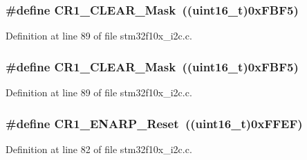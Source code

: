 \subsubsection[{\texorpdfstring{C\+R1\+\_\+\+C\+L\+E\+A\+R\+\_\+\+Mask}{CR1_CLEAR_Mask}}]{\setlength{\rightskip}{0pt plus 5cm}\#define C\+R1\+\_\+\+C\+L\+E\+A\+R\+\_\+\+Mask~(({\bf uint16\+\_\+t})0x\+F\+B\+F5)}\hypertarget{group___i2_c___private___defines_ga67f7dd35ea3d1296677e5fc50b88fa90}{}\label{group___i2_c___private___defines_ga67f7dd35ea3d1296677e5fc50b88fa90}


Definition at line 89 of file stm32f10x\+\_\+i2c.\+c.

\subsubsection[{\texorpdfstring{C\+R1\+\_\+\+C\+L\+E\+A\+R\+\_\+\+Mask}{CR1_CLEAR_Mask}}]{\setlength{\rightskip}{0pt plus 5cm}\#define C\+R1\+\_\+\+C\+L\+E\+A\+R\+\_\+\+Mask~(({\bf uint16\+\_\+t})0x\+F\+B\+F5)}\hypertarget{group___i2_c___private___defines_ga67f7dd35ea3d1296677e5fc50b88fa90}{}\label{group___i2_c___private___defines_ga67f7dd35ea3d1296677e5fc50b88fa90}


Definition at line 89 of file stm32f10x\+\_\+i2c.\+c.

\subsubsection[{\texorpdfstring{C\+R1\+\_\+\+E\+N\+A\+R\+P\+\_\+\+Reset}{CR1_ENARP_Reset}}]{\setlength{\rightskip}{0pt plus 5cm}\#define C\+R1\+\_\+\+E\+N\+A\+R\+P\+\_\+\+Reset~(({\bf uint16\+\_\+t})0x\+F\+F\+E\+F)}\hypertarget{group___i2_c___private___defines_ga173b065ec9b7b33c0fa0bf71c0fa2207}{}\label{group___i2_c___private___defines_ga173b065ec9b7b33c0fa0bf71c0fa2207}


Definition at line 82 of file stm32f10x\+\_\+i2c.\+c.

